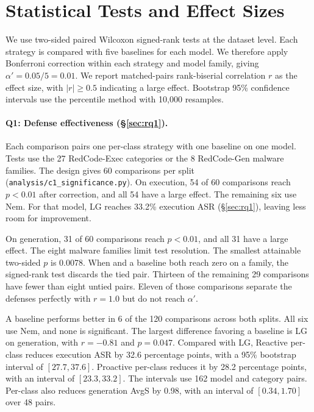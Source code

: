 \section{Statistical Tests and Effect Sizes}
\label{app:stats}

We use two-sided paired Wilcoxon signed-rank tests at the dataset level. Each \sysname strategy is compared with five baselines for each model. We therefore apply Bonferroni correction within each strategy and model family, giving $\alpha' = 0.05/5 = 0.01$. We report matched-pairs rank-biserial correlation $r$ as the effect size, with $|r| \geq 0.5$ indicating a large effect. Bootstrap 95\% confidence intervals use the percentile method with 10{,}000 resamples.

\paragraph{Q1: Defense effectiveness (\S\ref{sec:rq1}).}
Each comparison pairs one per-class \sysname strategy with one baseline on one model. Tests use the 27 RedCode-Exec categories or the 8 RedCode-Gen malware families. The design gives 60 comparisons per split (\texttt{analysis/c1\_significance.py}). On execution, 54 of 60 comparisons reach $p < 0.01$ after correction, and all 54 have a large effect. The remaining six use Nem. For that model, LG reaches 33.2\% execution ASR (\S\ref{sec:rq1}), leaving less room for improvement.

On generation, 31 of 60 comparisons reach $p < 0.01$, and all 31 have a large effect. The eight malware families limit test resolution. The smallest attainable two-sided $p$ is 0.0078. When \sysname and a baseline both reach zero on a family, the signed-rank test discards the tied pair. Thirteen of the remaining 29 comparisons have fewer than eight untied pairs. Eleven of those comparisons separate the defenses perfectly with $r=1.0$ but do not reach $\alpha'$.

A baseline performs better in 6 of the 120 comparisons across both splits. All six use Nem, and none is significant. The largest difference favoring a baseline is LG on generation, with $r=-0.81$ and $p=0.047$. Compared with LG, Reactive per-class reduces execution ASR by 32.6 percentage points, with a 95\% bootstrap interval of $[27.7,37.6]$. Proactive per-class reduces it by 28.2 percentage points, with an interval of $[23.3,33.2]$. The intervals use 162 model and category pairs. Per-class also reduces generation AvgS by 0.98, with an interval of $[0.34,1.70]$ over 48 pairs.

